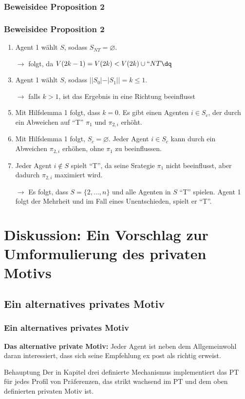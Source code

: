 \documentclass{beamer}
\begin{document}
\subsubsection{Beweisidee Proposition 2}
\begin{frame}\frametitle{Beweisidee Proposition 2}
\begin{enumerate}
\item Agent 1 w\"ahlt $S$, sodass $S_{NT}=\varnothing$.
\item [$\rightarrow$] folgt, da $V(2k-1)=V(2k)<V(2k) \cup ``NT\dq$
\item Agent 1 w\"ahlt $S$, sodass $\vert \vert S_0 \vert - \vert S_1 \vert \vert = k \leq 1$.
\item [$\rightarrow$] falls $k>1$, ist das Ergebnis in eine Richtung beeinflusst
\item Mit Hilfslemma 1 folgt, dass $k=0$. Es gibt einen Agenten $i \in S_c$, der durch ein Abweichen auf ``T'' $\pi_1$ und $\pi_{2,i}$ erh\"oht.
\item Mit Hilfslemma 1 folgt, $S_c=\varnothing$. Jeder Agent $i \in S_c$ kann durch ein Abweichen $\pi_{2,i}$ erh\"ohen, ohne $\pi_1$ zu beeinflussen.
\item Jeder Agent $i \notin S$ spielt ``T'', da seine Srategie $\pi_1$ nicht beeinflusst, aber dadurch $\pi_{2,i}$ maximiert wird.
\item [$\rightarrow$] Es folgt, dass $S=\{2,...,n\}$ und alle Agenten in $S$ ``T'' spielen. Agent 1 folgt der Mehrheit und im Fall eines Unentschieden, spielt er ``T''.
\end{enumerate}
\end{frame}









\section[alternatives privates Motiv]{Diskussion: Ein Vorschlag zur Umformulierung des privaten Motivs}

\subsection{Ein alternatives privates Motiv}
\begin{frame}\frametitle{Ein alternatives privates Motiv}
\vspace{-1.2cm}
\textbf{Das alternative private Motiv:} Jeder Agent ist neben dem Allgemeinwohl daran interessiert, dass sich seine Empfehlung ex post als richtig erweist.
\vspace{0.4cm}
\begin{block}{Behauptung}
Der in Kapitel drei definierte Mechanismus implementiert das PT f\"ur jedes Profil von Pr\"aferenzen, das strikt wachsend im PT und dem oben definierten privaten Motiv ist.
\end{block}


\end{frame}
\end{document}
